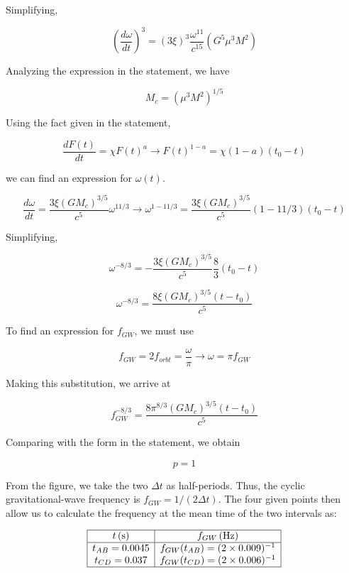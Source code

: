 \documentclass[11pt]{article}
\begin{document}
\begin{pproblem}
\begin{pssolution*}{}{}
\begin{alternativas}
        Simplifying,

        \[\boxed{\left(\frac{d\omega}{dt}\right)^3 = (3\xi)^3\frac{\omega^{11}}{c^{{15}}}(G^5\mu^3M^2)}\]

        Analyzing the expression in the statement, we have

        \[\boxed{M_c = (\mu^3 M^2)^{1/5}}\]

        \item Using the fact given in the statement,
        
        \[\frac{d F(t)}{dt} = \chi F(t)^a \rightarrow F(t)^{1-a} = \chi (1-a)(t_0-t)\]

        we can find an expression for \(\omega(t)\).

        \[\frac{d\omega}{dt} = \frac{3\xi (GM_c)^{3/5}}{c^5}\omega^{11/3} \rightarrow \omega^{1-11/3} = \frac{3\xi (GM_c)^{3/5}}{c^5}(1-11/3)(t_0-t)\]

        Simplifying,

        \[\omega ^{-8/3} = -\frac{3\xi (GM_c)^{3/5}}{c^5}\frac{8}{3}(t_0-t)\]

        \[\omega^{-8/3} = \frac{8\xi (GM_c)^{3/5}(t-t_0)}{c^5}\]

        To find an expression for \(f_{GW}\), we must use

        \[f_{GW} = 2f_{orbt} = \frac{\omega}{\pi}\rightarrow \omega = \pi f_{GW}\]

        Making this substitution, we arrive at


        \[f_{GW}^{-8/3} = \frac{8\pi^{8/3}(GM_c)^{3/5}(t-t_0)}{c^5}\]

        Comparing with the form in the statement, we obtain

        \[\boxed{p = 1}\]

        \item From the figure, we take the two $\Delta t$ as half-periods. Thus, the cyclic gravitational-wave frequency is $f_{GW} = 1/(2 \Delta t)$. The four given points then allow us to calculate the frequency at the mean time of the two intervals as:

        \[
        \begin{array}{|c|c|}
        \hline
        t \, (\text{s}) & f_{GW} \, (\text{Hz}) \\
        \hline
        t_{AB} = 0.0045 & f_{GW}(t_{AB}) = (2 \times 0.009)^{-1} \\
        t_{CD} = 0.037 & f_{GW}(t_{CD}) = (2 \times 0.006)^{-1} \\
        \hline
        \end{array}
        \]
        

\end{alternativas}
\end{pssolution*}
\end{pproblem}
\end{document}
